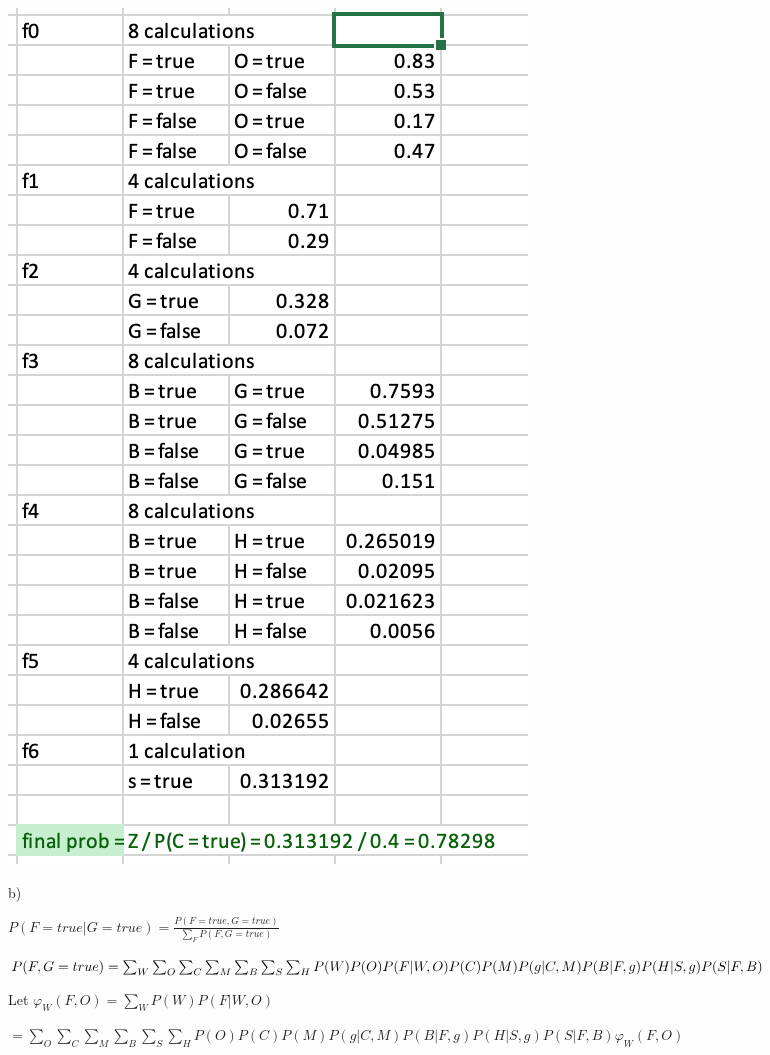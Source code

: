 \documentclass[12pt]{article}
\begin{document}
\includegraphics[scale=0.8]{q1-factors}

b) 

$P(F = true \vert G = true) = \frac{P(F = true, G = true)}{\sum_F P(F, G = true)}$

$P(F, G = true) = \sum_W\sum_O\sum_C\sum_M\sum_B\sum_S\sum_H P(W)P(O)P(F\vert W, O)P(C)P(M)P(g \vert C, M)\\P(B \vert F, g)P(H \vert S, g)P(S \vert F, B)$

Let $\varphi_W(F, O) = \sum_W P(W)P(F \vert W, O)$

$= \sum_O\sum_C\sum_M\sum_B\sum_S\sum_H P(O)P(C)P(M)P(g \vert C, M)P(B \vert F, g)P(H \vert S, g)P(S \vert F, B)\varphi_W(F, O)$
\end{document}
